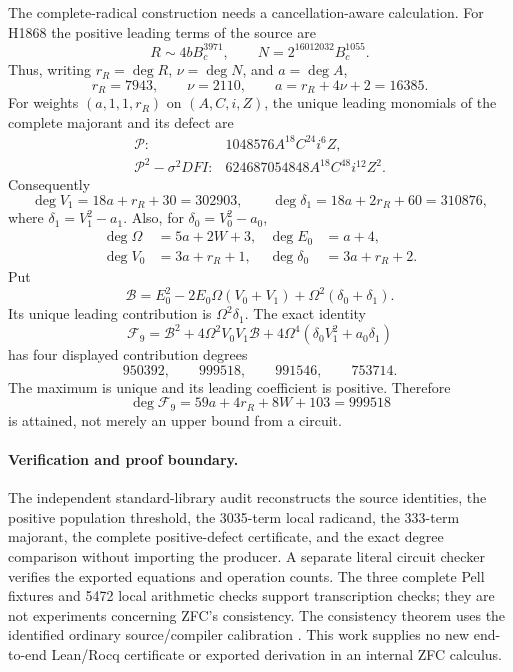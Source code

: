 The complete-radical construction needs a cancellation-aware calculation.
For H1868 the positive leading terms of the source are
\[
 R\sim4bB_c^{3971},\qquad
 N=2^{16012032}B_c^{1055}.
\]
Thus, writing \(r_R=\deg R\), \(\nu=\deg N\), and \(a=\deg A\),
\[
 r_R=7943,\qquad \nu=2110,\qquad
 a=r_R+4\nu+2=16385.
\]
For weights \((a,1,1,r_R)\) on \((A,C,i,Z)\), the unique leading
monomials of the complete majorant and its defect are
\[
\begin{array}{ll}
 \mathcal P:&1048576A^{18}C^{24}i^6Z,\\
 \mathcal P^2-\sigma^2DFI:
   &624687054848A^{18}C^{48}i^{12}Z^2 .
\end{array}
\]
Consequently
\[
 \deg V_1=18a+r_R+30=302903,\qquad
 \deg\delta_1=18a+2r_R+60=310876,
\]
where \(\delta_1=V_1^2-a_1\). Also, for \(\delta_0=V_0^2-a_0\),
\[
\begin{aligned}
 \deg\Omega&=5a+2W+3,&\deg E_0&=a+4,\\
 \deg V_0&=3a+r_R+1,&\deg\delta_0&=3a+r_R+2.
\end{aligned}
\]
Put
\[
 \mathcal B=E_0^2-2E_0\Omega(V_0+V_1)
                         +\Omega^2(\delta_0+\delta_1).
\]
Its unique leading contribution is \(\Omega^2\delta_1\). The exact identity
\[
 \mathcal F_9=\mathcal B^2+4\Omega^2V_0V_1\mathcal B
            +4\Omega^4(\delta_0V_1^2+a_0\delta_1)
\]
has four displayed contribution degrees
\[
 950392,\qquad \boxed{999518},\qquad 991546,\qquad 753714.
\]
The maximum is unique and its leading coefficient is positive. Therefore
\[
 \deg\mathcal F_9=59a+4r_R+8W+103=999518
\]
is attained, not merely an upper bound from a circuit.

\paragraph{Verification and proof boundary.}
The independent standard-library audit reconstructs the source identities,
the positive population threshold, the 3035-term local radicand, the
333-term majorant, the complete positive-defect certificate, and the exact
degree comparison without importing the producer. A separate literal
circuit checker verifies the exported equations and operation counts.
The three complete Pell fixtures and 5472 local arithmetic checks support
transcription checks; they are not experiments concerning ZFC's
consistency. The consistency theorem uses the identified ordinary
source/compiler calibration \cite{repo,source71}. This work supplies no new
end-to-end Lean/Rocq certificate or exported derivation in an internal ZFC
calculus.
